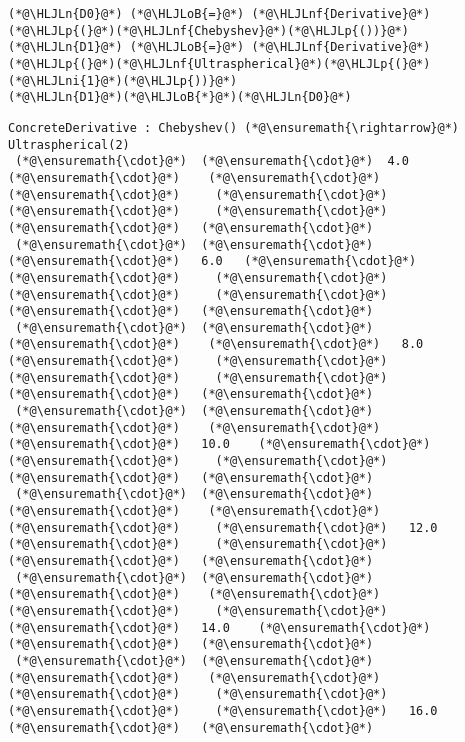 \documentclass[12pt,landscape]{article}
\newcommand{\HLJLn}[1]{#1}
\newcommand{\HLJLnf}[1]{\textcolor[RGB]{66,102,213}{#1}}
\newcommand{\HLJLni}[1]{\textcolor[RGB]{59,151,46}{#1}}
\newcommand{\HLJLoB}[1]{\textcolor[RGB]{102,102,102}{\textbf{#1}}}
\newcommand{\HLJLp}[1]{#1}
\begin{document}
{\begin{lstlisting}
(*@\HLJLn{D0}@*) (*@\HLJLoB{=}@*) (*@\HLJLnf{Derivative}@*)(*@\HLJLp{(}@*)(*@\HLJLnf{Chebyshev}@*)(*@\HLJLp{())}@*)
(*@\HLJLn{D1}@*) (*@\HLJLoB{=}@*) (*@\HLJLnf{Derivative}@*)(*@\HLJLp{(}@*)(*@\HLJLnf{Ultraspherical}@*)(*@\HLJLp{(}@*)(*@\HLJLni{1}@*)(*@\HLJLp{))}@*)
(*@\HLJLn{D1}@*)(*@\HLJLoB{*}@*)(*@\HLJLn{D0}@*)
\end{lstlisting}

\begin{lstlisting}
ConcreteDerivative : Chebyshev() (*@\ensuremath{\rightarrow}@*) Ultraspherical(2)
 (*@\ensuremath{\cdot}@*)  (*@\ensuremath{\cdot}@*)  4.0   (*@\ensuremath{\cdot}@*)    (*@\ensuremath{\cdot}@*)     (*@\ensuremath{\cdot}@*)     (*@\ensuremath{\cdot}@*)     (*@\ensuremath{\cdot}@*)     (*@\ensuremath{\cdot}@*)     (*@\ensuremath{\cdot}@*)   (*@\ensuremath{\cdot}@*)
 (*@\ensuremath{\cdot}@*)  (*@\ensuremath{\cdot}@*)   (*@\ensuremath{\cdot}@*)   6.0   (*@\ensuremath{\cdot}@*)     (*@\ensuremath{\cdot}@*)     (*@\ensuremath{\cdot}@*)     (*@\ensuremath{\cdot}@*)     (*@\ensuremath{\cdot}@*)     (*@\ensuremath{\cdot}@*)   (*@\ensuremath{\cdot}@*)
 (*@\ensuremath{\cdot}@*)  (*@\ensuremath{\cdot}@*)   (*@\ensuremath{\cdot}@*)    (*@\ensuremath{\cdot}@*)   8.0    (*@\ensuremath{\cdot}@*)     (*@\ensuremath{\cdot}@*)     (*@\ensuremath{\cdot}@*)     (*@\ensuremath{\cdot}@*)     (*@\ensuremath{\cdot}@*)   (*@\ensuremath{\cdot}@*)
 (*@\ensuremath{\cdot}@*)  (*@\ensuremath{\cdot}@*)   (*@\ensuremath{\cdot}@*)    (*@\ensuremath{\cdot}@*)    (*@\ensuremath{\cdot}@*)   10.0    (*@\ensuremath{\cdot}@*)     (*@\ensuremath{\cdot}@*)     (*@\ensuremath{\cdot}@*)     (*@\ensuremath{\cdot}@*)   (*@\ensuremath{\cdot}@*)
 (*@\ensuremath{\cdot}@*)  (*@\ensuremath{\cdot}@*)   (*@\ensuremath{\cdot}@*)    (*@\ensuremath{\cdot}@*)    (*@\ensuremath{\cdot}@*)     (*@\ensuremath{\cdot}@*)   12.0    (*@\ensuremath{\cdot}@*)     (*@\ensuremath{\cdot}@*)     (*@\ensuremath{\cdot}@*)   (*@\ensuremath{\cdot}@*)
 (*@\ensuremath{\cdot}@*)  (*@\ensuremath{\cdot}@*)   (*@\ensuremath{\cdot}@*)    (*@\ensuremath{\cdot}@*)    (*@\ensuremath{\cdot}@*)     (*@\ensuremath{\cdot}@*)     (*@\ensuremath{\cdot}@*)   14.0    (*@\ensuremath{\cdot}@*)     (*@\ensuremath{\cdot}@*)   (*@\ensuremath{\cdot}@*)
 (*@\ensuremath{\cdot}@*)  (*@\ensuremath{\cdot}@*)   (*@\ensuremath{\cdot}@*)    (*@\ensuremath{\cdot}@*)    (*@\ensuremath{\cdot}@*)     (*@\ensuremath{\cdot}@*)     (*@\ensuremath{\cdot}@*)     (*@\ensuremath{\cdot}@*)   16.0    (*@\ensuremath{\cdot}@*)   (*@\ensuremath{\cdot}@*)

\end{lstlisting}}
\end{document}
